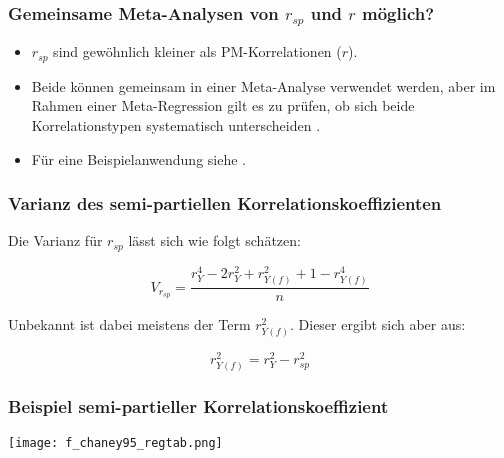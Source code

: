 \begin{frame}
  \frametitle{Gemeinsame Meta-Analysen von $r_{sp}$ und $r$ möglich?}
  
  \begin{itemize}
  \item $r_{sp}$ sind gewöhnlich kleiner als PM-Korrelationen ($r$).
  \item Beide können gemeinsam in einer Meta-Analyse verwendet werden, aber im
    Rahmen einer Meta-Regression gilt es zu prüfen, ob sich beide Korrelationstypen
    systematisch unterscheiden \citep[346]{aloe_advances_2011}.
  \item Für eine Beispielanwendung siehe \citet{aloe_teacher_2009}.
  \end{itemize}
\end{frame}



\begin{frame}
  \frametitle{Varianz des semi-partiellen Korrelationskoeffizienten}
  Die Varianz für $r_{sp}$ lässt sich wie folgt schätzen:
  
  \begin{equation}
    V_{r_{sp}}= \frac{r^4_Y-2r^2_Y+r^2_{Y(f)}+1-r^4_{Y(f)}}{n}
  \end{equation}

  Unbekannt ist dabei meistens der Term $r^2_{Y(f)}$. Dieser ergibt sich aber aus:
  
  \begin{equation}
    r^2_{Y(f)}=r^2_Y - r^2_{sp}
  \end{equation}
  
\end{frame}


\begin{frame}
  \frametitle{Beispiel semi-partieller Korrelationskoeffizient}\label{slide:chaney-tab}

  \texttt{[image: f\_chaney95\_regtab.png]}
    
  \citep[Quelle:][74; die Tabelle ist nicht vollständig dargestellt]{chaney_student_1995}
  
\end{frame}


